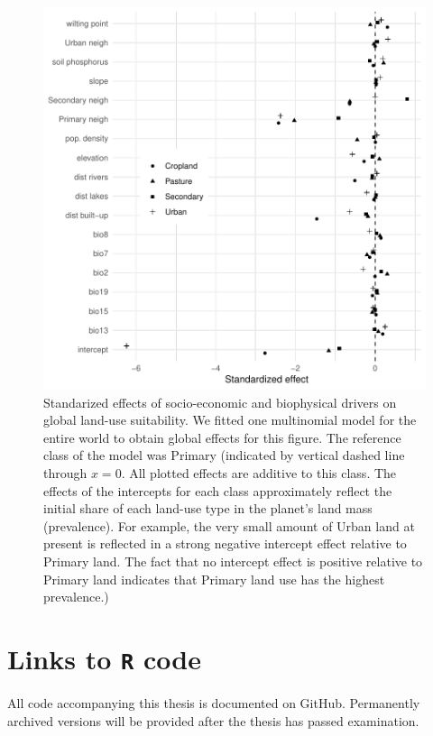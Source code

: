 \documentclass[titlesmallcaps,copyrightpage]{uomthesis}\usepackage[]{graphicx}\usepackage[]{color}
\begin{document}
\begin{figure}[htb]
  \centering
    \includegraphics{chapters/figures/chapter4/fig_landuseeffects.pdf} 
    \caption{Standarized effects of socio-economic and biophysical drivers on global land-use suitability. We fitted one multinomial model for the entire world to obtain global effects for this figure. The reference class of the model was Primary (indicated by vertical dashed line through \(x=0\). All plotted effects are additive to this class. The effects of the intercepts for each class approximately reflect the initial share of each land-use type in the planet's land mass (prevalence). For example, the very small amount of Urban land at present is reflected in a strong negative intercept effect relative to Primary land. The fact that no intercept effect is positive relative to Primary land indicates that Primary land use has the highest prevalence.)}
    \label{apx:ch4:fig_landuseeffects}
\end{figure}

    

\chapter{Links to \texttt{R} code}
\label{apx:ch5}
\newpage

\noindent All code accompanying this thesis is documented on GitHub. Permanently archived versions will be provided after the thesis has passed examination.
\end{document}
